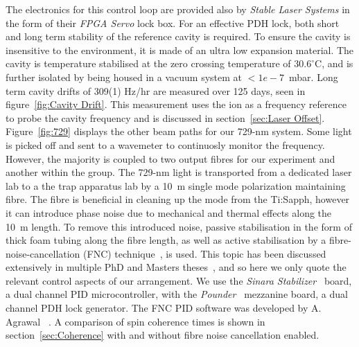     The electronics for this control loop are
    provided also by \emph{Stable Laser Systems} in the form of their \emph{FPGA Servo}
    lock box. For an effective PDH lock, both short and long term
    stability of the reference cavity is required. To ensure the cavity is insensitive to
    the environment, it is made of an ultra low expansion material. 
    The cavity is temperature stabilised at the zero crossing temperature of
    $30.6^\circ$C, and is further isolated by being housed in a vacuum system
    at $<1e-7$~mbar. Long term cavity drifts of 309(1) Hz/hr are measured over
    125 days, seen in figure~\ref{fig:Cavity Drift}. This measurement uses the ion as a
    frequency reference to probe the cavity frequency and is discussed in
    section~\ref{sec:Laser Offset}.\\
    Figure~\ref{fig:729} displays the other beam paths for our 729-nm system.
    Some light is picked off and sent to a wavemeter to continuosly monitor the
    frequency. However, the majority is coupled to two output fibres for our
    experiment and another within the group. The 729-nm light is transported from
    a dedicated laser lab to a the trap apparatus lab by a 10~m
    single mode polarization maintaining fibre.  The fibre is
    beneficial in cleaning up the mode from the Ti:Sapph, however it can
    introduce phase noise due to mechanical and thermal effects along the 10~m
    length. To remove this introduced noise, passive stabilisation in
    the form of thick foam tubing along the fibre length, as well as active
    stabilisation by a fibre-noise-cancellation (FNC) technique~\cite{}, is used. This
    topic has been discussed extensively in multiple PhD and Masters
    theses~\cite{}, and so here we only quote the relevant control aspects of
    our arrangement. We use the \emph{Sinara Stabilizer}~\cite{} board, a
    dual channel PID microcontroller, with the \emph{Pounder}~\cite{}
    mezzanine board, a dual channel PDH lock generator. The FNC PID software was
    developed by A. Agrawal ~\cite{}. A comparison of spin coherence times
    is shown in section~\ref{sec:Coherence} with and without fibre noise
    cancellation enabled. \\


